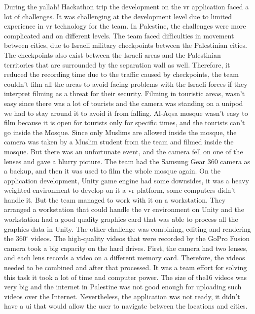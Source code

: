 During the \acrshort{yallah!} Hackathon trip the development on the \acrshort{vr} application faced a lot of challenges. It was challenging at the development level due to limited experience in \acrshort{vr} technology for the team. In Palestine, the challenges were more complicated and on different levels. The team faced difficulties in movement between cities, due to Israeli military checkpoints between the Palestinian cities. The checkpoints also exist between the Israeli areas and the Palestinian territories that are surrounded by the separation wall as well. Therefore, it reduced the recording time due to the traffic caused by checkpoints, the team couldn't film all the areas to avoid facing problems with the Israeli forces if they interpret filming as a threat for their security. Filming in touristic areas, wasn’t easy since there was a lot of tourists and the camera was standing on a unipod we had to stay around it to avoid it from falling. Al-Aqsa mosque wasn’t easy to film because it is open for tourists only for specific times, and the tourists can’t go inside the Mosque. Since only Muslims are allowed inside the mosque, the camera was taken by a Muslim student from the team and filmed inside the mosque. But there was an unfortunate event, and the camera fell on one of the lenses and gave a blurry picture. The team had the Samsung Gear 360 camera as a backup, and then it was used to film the whole mosque again. On the application development, Unity game engine had some downsides, it was a heavy weighted environment to develop on it a \acrshort{vr} platform, some computers didn’t handle it. But the team managed to work with it on a workstation. They arranged a workstation that could handle the \acrshort{vr} environment on Unity and the workstation had a good quality graphics card that was able to process all the graphics data in Unity. The other challenge was combining, editing and rendering the 360$^{\circ}$ videos. The high-quality videos that were recorded by the GoPro Fusion camera took a big capacity on the hard drives. First, the camera had two lenses, and each lens records a video on a different memory card. Therefore, the videos needed to be combined and after that processed. It was a team effort for solving this task it took a lot of time and computer power. The size of the16 videos was very big and the internet in Palestine was not good enough for uploading such videos over the Internet. Nevertheless, the application was not ready, it didn't have a \acrfull{ui} that would allow the user to navigate between the locations and cities. 
